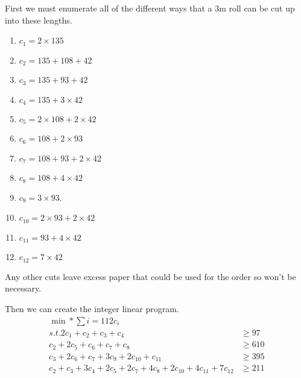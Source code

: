 \documentclass[11pt, oneside]{article}
\begin{document}
\begin{enumerate}
        First we must enumerate all of the different ways that a 3m roll can be
        cut up into these lengths.
        \begin{enumerate}
            \item $c_1 = 2 \times 135$
            \item $c_2 = 135 + 108 + 42$
            \item $c_3 = 135 + 93 + 42$
            \item $c_4 = 135 + 3 \times 42$
            \item $c_5 = 2 \times 108 + 2 \times 42$
            \item $c_6 = 108 + 2 \times 93$
            \item $c_7 = 108 + 93 + 2 \times 42$
            \item $c_8 = 108 + 4 \times 42$
            \item $c_9 = 3 \times 93$.
            \item $c_{10} = 2 \times 93 + 2 \times 42$
            \item $c_{11} = 93 + 4 \times 42$
            \item $c_{12} = 7 \times 42$
        \end{enumerate}
        Any other cuts leave excess paper that could be used for the order so
        won't be necessary.

        Then we can create the integer linear program.
        \begin{align*}
            \min* \sum{i = 1}{12}{c_i} \\
            s.t. 
            2c_1 + c_2 + c_3 + c_4 &\ge 97 \\
            c_2 + 2c_5 + c_6 + c_7 + c_8 &\ge 610 \\
            c_3 + 2 c_6 + c_7 + 3c_9 + 2c_{10} + c_{11} &\ge 395 \\
            c_2 + c_3 + 3c_4 + 2c_5 + 2c_7 + 4c_8 + 2c_{10} + 4c_{11} + 7c_{12} &\ge 211
        \end{align*}

\end{enumerate}
\end{document}
